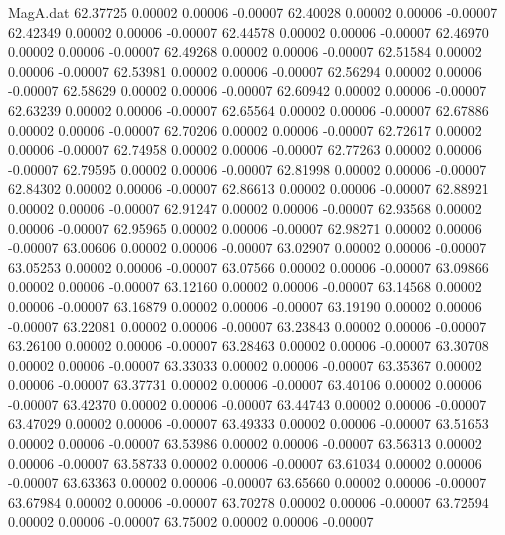 \begin{filecontents}{MagA.dat}
  62.37725    0.00002    0.00006   -0.00007
  62.40028    0.00002    0.00006   -0.00007
  62.42349    0.00002    0.00006   -0.00007
  62.44578    0.00002    0.00006   -0.00007
  62.46970    0.00002    0.00006   -0.00007
  62.49268    0.00002    0.00006   -0.00007
  62.51584    0.00002    0.00006   -0.00007
  62.53981    0.00002    0.00006   -0.00007
  62.56294    0.00002    0.00006   -0.00007
  62.58629    0.00002    0.00006   -0.00007
  62.60942    0.00002    0.00006   -0.00007
  62.63239    0.00002    0.00006   -0.00007
  62.65564    0.00002    0.00006   -0.00007
  62.67886    0.00002    0.00006   -0.00007
  62.70206    0.00002    0.00006   -0.00007
  62.72617    0.00002    0.00006   -0.00007
  62.74958    0.00002    0.00006   -0.00007
  62.77263    0.00002    0.00006   -0.00007
  62.79595    0.00002    0.00006   -0.00007
  62.81998    0.00002    0.00006   -0.00007
  62.84302    0.00002    0.00006   -0.00007
  62.86613    0.00002    0.00006   -0.00007
  62.88921    0.00002    0.00006   -0.00007
  62.91247    0.00002    0.00006   -0.00007
  62.93568    0.00002    0.00006   -0.00007
  62.95965    0.00002    0.00006   -0.00007
  62.98271    0.00002    0.00006   -0.00007
  63.00606    0.00002    0.00006   -0.00007
  63.02907    0.00002    0.00006   -0.00007
  63.05253    0.00002    0.00006   -0.00007
  63.07566    0.00002    0.00006   -0.00007
  63.09866    0.00002    0.00006   -0.00007
  63.12160    0.00002    0.00006   -0.00007
  63.14568    0.00002    0.00006   -0.00007
  63.16879    0.00002    0.00006   -0.00007
  63.19190    0.00002    0.00006   -0.00007
  63.22081    0.00002    0.00006   -0.00007
  63.23843    0.00002    0.00006   -0.00007
  63.26100    0.00002    0.00006   -0.00007
  63.28463    0.00002    0.00006   -0.00007
  63.30708    0.00002    0.00006   -0.00007
  63.33033    0.00002    0.00006   -0.00007
  63.35367    0.00002    0.00006   -0.00007
  63.37731    0.00002    0.00006   -0.00007
  63.40106    0.00002    0.00006   -0.00007
  63.42370    0.00002    0.00006   -0.00007
  63.44743    0.00002    0.00006   -0.00007
  63.47029    0.00002    0.00006   -0.00007
  63.49333    0.00002    0.00006   -0.00007
  63.51653    0.00002    0.00006   -0.00007
  63.53986    0.00002    0.00006   -0.00007
  63.56313    0.00002    0.00006   -0.00007
  63.58733    0.00002    0.00006   -0.00007
  63.61034    0.00002    0.00006   -0.00007
  63.63363    0.00002    0.00006   -0.00007
  63.65660    0.00002    0.00006   -0.00007
  63.67984    0.00002    0.00006   -0.00007
  63.70278    0.00002    0.00006   -0.00007
  63.72594    0.00002    0.00006   -0.00007
  63.75002    0.00002    0.00006   -0.00007

\end{filecontents}
